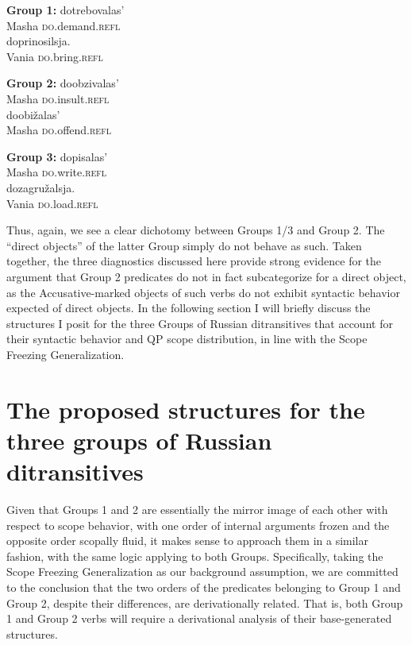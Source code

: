 \documentclass[output=paper,colorlinks,citecolor=brown,nonflat]{./langscibook}
\begin{document}
\ea%
    \label{ex:antonyuk:44}
    \textbf{Group 1:}
    \ea \label{ex:antonyuk:44a}
       {dotrebovalas’}\\
    {} Masha   \textsc{do}.demand.\textsc{refl}\\
    \ex \label{ex:antonyuk:44b}
       {doprinosilsja}.\\
    Vania   \textsc{do}.bring.\textsc{refl}\\
    \z
\z

\ea%
    \label{ex:antonyuk:45}
    \textbf{Group 2:}
    \ea \label{ex:antonyuk:45a}
       {doobzivalas’}\\
    Masha \textsc{do}.insult.\textsc{refl}\\
    \ex \label{ex:antonyuk:45b}
      {doobižalas’}\\
    Masha \textsc{do}.offend.\textsc{refl}\\
    \z
\z

\ea%
    \label{ex:antonyuk:46}
    \textbf{Group 3:}
    \ea \label{ex:antonyuk:46a}
     {dopisalas’}\\
    Masha \textsc{do}.write.\textsc{refl}\\
    \ex \label{ex:antonyuk:46b}
     {dozagružalsja}.\\
    Vania \textsc{do}.load.\textsc{refl}\\
    \z
\z

Thus, again, we see a clear dichotomy between Groups 1/3 and Group 2. The “direct objects” of the latter Group simply do not behave as such. Taken together, the three diagnostics discussed here provide strong evidence for the argument that Group 2 predicates do not in fact subcategorize for a direct object, as the Accusative-marked objects of such verbs do not exhibit syntactic behavior expected of direct objects. In the following section I will briefly discuss the structures I posit for the three Groups of Russian ditransitives that account for their syntactic behavior and QP scope distribution, in line with the Scope Freezing Generalization.

\section{The proposed structures for the three groups of Russian ditransitives}\label{sec:antonyuk:4}

Given that Groups 1 and 2 are essentially the mirror image of each other with respect to scope behavior, with one order of internal arguments frozen and the opposite order scopally fluid, it makes sense to approach them in a similar fashion, with the same logic applying to both Groups. Specifically, taking the Scope Freezing Generalization as our background assumption, we are committed to the conclusion that the two orders of the predicates belonging to Group 1 and Group 2, despite their differences, are derivationally related. That is, both Group 1 and Group 2 verbs will require a derivational analysis of their base-generated structures.
\end{document}

